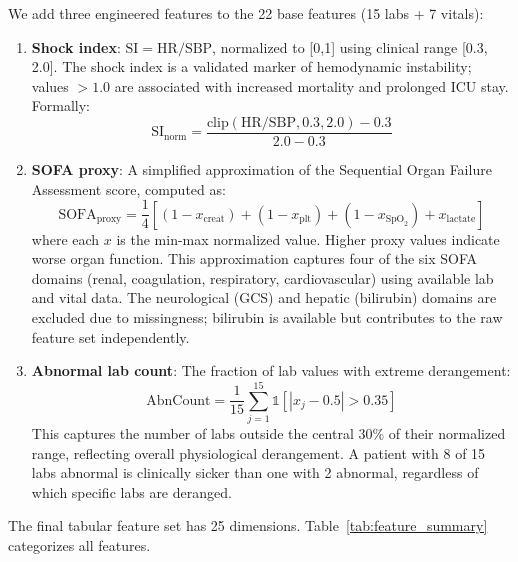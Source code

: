 We add three engineered features to the 22 base features (15 labs + 7 vitals):
\begin{enumerate}
\item \textbf{Shock index}: $\text{SI} = \text{HR} / \text{SBP}$, normalized to [0,1] using clinical range [0.3, 2.0]. The shock index is a validated marker of hemodynamic instability; values $>1.0$ are associated with increased mortality and prolonged ICU stay. Formally:
\begin{equation}
\text{SI}_{\text{norm}} = \frac{\text{clip}(\text{HR}/\text{SBP}, 0.3, 2.0) - 0.3}{2.0 - 0.3}
\end{equation}

\item \textbf{SOFA proxy}: A simplified approximation of the Sequential Organ Failure Assessment score, computed as:
\begin{equation}
\text{SOFA}_{\text{proxy}} = \frac{1}{4}\left[(1 - x_{\text{creat}}) + (1 - x_{\text{plt}}) + (1 - x_{\text{SpO}_2}) + x_{\text{lactate}}\right]
\end{equation}
where each $x$ is the min-max normalized value. Higher proxy values indicate worse organ function. This approximation captures four of the six SOFA domains (renal, coagulation, respiratory, cardiovascular) using available lab and vital data. The neurological (GCS) and hepatic (bilirubin) domains are excluded due to missingness; bilirubin is available but contributes to the raw feature set independently.

\item \textbf{Abnormal lab count}: The fraction of lab values with extreme derangement:
\begin{equation}
\text{AbnCount} = \frac{1}{15}\sum_{j=1}^{15} \mathbb{1}[|x_j - 0.5| > 0.35]
\end{equation}
This captures the number of labs outside the central 30\% of their normalized range, reflecting overall physiological derangement. A patient with 8 of 15 labs abnormal is clinically sicker than one with 2 abnormal, regardless of which specific labs are deranged.
\end{enumerate}
The final tabular feature set has 25 dimensions. Table~\ref{tab:feature_summary} categorizes all features.

